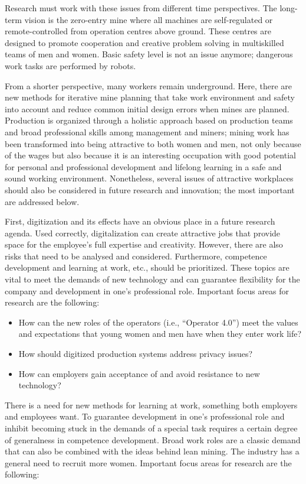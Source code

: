 \documentclass[
  12pt,
]{scrbook}
\begin{document}
Research must work with these issues from different time perspectives. The long-term vision is the zero-entry mine where all machines are self-regulated or remote-controlled from operation centres above ground. These centres are designed to promote cooperation and creative problem solving in multiskilled teams of men and women. Basic safety level is not an issue anymore; dangerous work tasks are performed by robots.

From a shorter perspective, many workers remain underground. Here, there are new methods for iterative mine planning that take work environment and safety into account and reduce common initial design errors when mines are planned. Production is organized through a holistic approach based on production teams and broad professional skills among management and miners; mining work has been transformed into being attractive to both women and men, not only because of the wages but also because it is an interesting occupation with good potential for personal and professional development and lifelong learning in a safe and sound working environment. Nonetheless, several issues of attractive workplaces should also be considered in future research and innovation; the most important are addressed below.

First, digitization and its effects have an obvious place in a future research agenda. Used correctly, digitalization can create attractive jobs that provide space for the employee's full expertise and creativity. However, there are also risks that need to be analysed and considered. Furthermore, competence development and learning at work, etc., should be prioritized. These topics are vital to meet the demands of new technology and can guarantee flexibility for the company and development in one's professional role. Important focus areas for research are the following:

\begin{itemize}
\item
  How can the new roles of the operators (i.e., ``Operator 4.0'') meet the values and expectations that young women and men have when they enter work life?
\item
  How should digitized production systems address privacy issues?
\item
  How can employers gain acceptance of and avoid resistance to new technology?
\end{itemize}

There is a need for new methods for learning at work, something both employers and employees want. To guarantee development in one's professional role and inhibit becoming stuck in the demands of a special task requires a certain degree of generalness in competence development. Broad work roles are a classic demand that can also be combined with the ideas behind lean mining. The industry has a general need to recruit more women. Important focus areas for research are the following:
\end{document}
